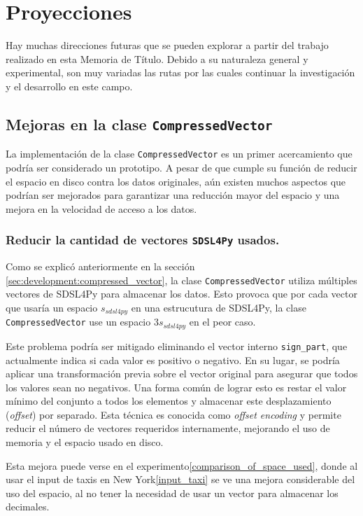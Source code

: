 \chapter{Proyecciones}
\label{proyecciones}
Hay muchas direcciones futuras que se pueden explorar a partir del trabajo realizado en esta Memoria de Título. Debido a su naturaleza general y experimental, son muy variadas las rutas por las cuales continuar la investigación y el desarrollo en este campo.

\section{Mejoras en la clase \texttt{CompressedVector}}

La implementación de la clase \texttt{CompressedVector} es un primer acercamiento que podría ser considerado un prototipo. A pesar de que cumple su función de reducir el espacio en disco contra los datos originales, aún existen muchos aspectos que podrían ser mejorados para garantizar una reducción mayor del espacio y una mejora en la velocidad de acceso a los datos.

\subsection{Reducir la cantidad de vectores \texttt{SDSL4Py} usados.}

Como se explicó anteriormente en la sección \ref{sec:development:compressed_vector}, la clase \texttt{CompressedVector} utiliza múltiples vectores de SDSL4Py para almacenar los datos. Esto provoca que por cada vector que usaría un espacio $s_{sdsl4py}$ en una estrucutura de SDSL4Py, la clase \texttt{CompressedVector} use un espacio $3s_{sdsl4py}$ en el peor caso. 

Este problema podría ser mitigado eliminando el vector interno \texttt{sign\_part}, que actualmente indica si cada valor es positivo o negativo. En su lugar, se podría aplicar una transformación previa sobre el vector original para asegurar que todos los valores sean no negativos. Una forma común de lograr esto es restar el valor mínimo del conjunto a todos los elementos y almacenar este desplazamiento (\textit{offset}) por separado. Esta técnica es conocida como \textit{offset encoding} y permite reducir el número de vectores requeridos internamente, mejorando el uso de memoria y el espacio usado en disco.

Esta mejora puede verse en el experimento\ref{comparison_of_space_used}, donde al usar el input de taxis en New York\ref{input_taxi} se ve una mejora considerable del uso del espacio, al no tener la necesidad de usar un vector para almacenar los decimales.

